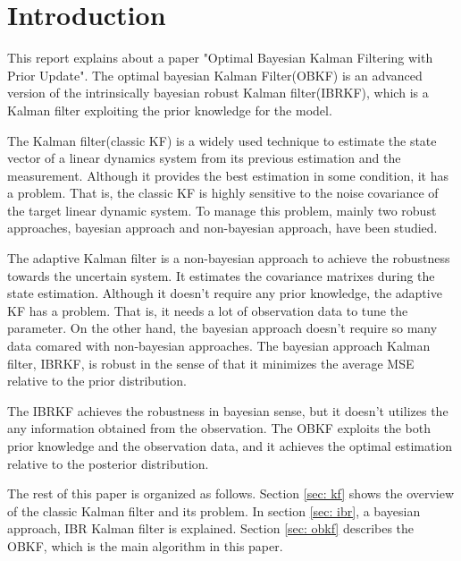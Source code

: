 \section{Introduction\label{introduction}}

This report explains about a paper "Optimal Bayesian Kalman Filtering with Prior Update"\cite{Dehghannasiri2018}. 
The optimal bayesian Kalman Filter(OBKF) is an advanced version of the intrinsically bayesian robust Kalman filter(IBRKF)\cite{Dehghannasiri2017}, which is a Kalman filter exploiting the prior knowledge for the model.

The Kalman filter(classic KF)\cite{Kalman1960} is a widely used technique to estimate the state vector of a linear dynamics system from its previous estimation and the measurement. Although it provides the best estimation in some condition, it has a problem. 
That is, the classic KF is highly sensitive to the noise covariance of the target linear dynamic system\cite{Sangsuk-Iam1990}. To manage this problem, mainly two robust approaches, bayesian approach and non-bayesian approach, have been studied. 

The adaptive Kalman filter\cite{Myers1976}\cite{Mehra1972} is a non-bayesian approach to achieve the robustness towards the uncertain system. It estimates the covariance matrixes during the state estimation. Although it doesn't require any prior knowledge, the adaptive KF has a problem. That is, it needs a lot of observation data to tune the parameter. 
On the other hand, the bayesian approach doesn't require so many data comared with non-bayesian approaches. The bayesian approach Kalman filter, IBRKF, is robust in the sense of that it minimizes the average MSE relative to the prior distribution. 

The IBRKF achieves the robustness in bayesian sense, but it doesn't utilizes the any information obtained from the observation. The OBKF exploits the both prior knowledge and the observation data, and it achieves the optimal estimation relative to the posterior distribution.

The rest of this paper is organized as follows. Section \ref{sec: kf} shows the overview of the classic Kalman filter and its problem. In section \ref{sec: ibr}, a bayesian approach, IBR Kalman filter is explained. Section \ref{sec: obkf} describes the OBKF, which is the main algorithm in this paper.
